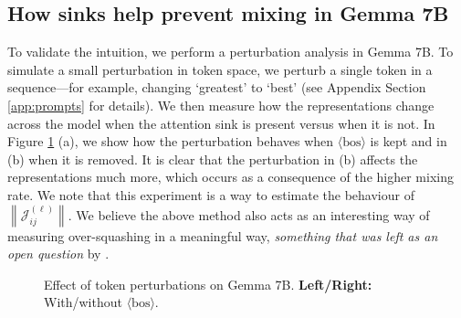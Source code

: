 \documentclass{article} %
\newcommand{\J}{\mathcal{J}}
\newcommand{\bos}{\ensuremath{\langle\text{bos}\rangle}\xspace}
\begin{document}
\subsection{How sinks help prevent mixing in Gemma 7B} To validate the intuition, we perform a perturbation analysis in Gemma 7B. To simulate a small perturbation in token space, we perturb a single token in a sequence—for example, changing ‘greatest’ to ‘best’ (see Appendix Section \ref{app:prompts} for details). We then measure how the representations change across the model when the attention sink is present versus when it is not. In Figure \ref{fig:perturbation} (a), we show how the perturbation behaves when \bos is kept and in (b) when it is removed. It is clear that the perturbation in (b) affects the representations much more, which occurs as a consequence of the higher mixing rate. We note that this experiment is a way to estimate the behaviour of $\left \lVert \J_{ij}^{(\ell)} \right \rVert$. We believe the above method also acts as an interesting way of measuring over-squashing in a meaningful way, \emph{something that was left as an open question} by \cite{barbero2024transformers}.


\begin{figure}[H]
    \centering
    \qquad
    \caption{Effect of token perturbations on Gemma 7B. \textbf{Left/Right:} With/without \bos.}%
    \label{fig:perturbation}%
    \vspace{-10pt}
\end{figure}
\end{document}

